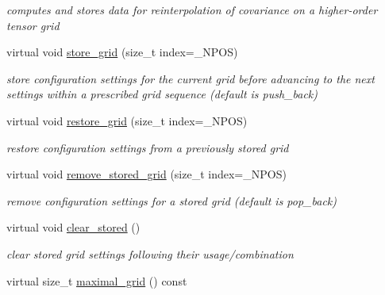 \begin{DoxyCompactItemize}
\begin{DoxyCompactList}\small\item\em computes and stores data for reinterpolation of covariance on a higher-\/order tensor grid \end{DoxyCompactList}\item 
virtual void \hyperlink{classPecos_1_1IntegrationDriver_aeae6e6d94a2e3e77d612eee151c77799}{store\+\_\+grid} (size\+\_\+t index=\+\_\+\+N\+P\+OS)\label{classPecos_1_1IntegrationDriver_aeae6e6d94a2e3e77d612eee151c77799}

\begin{DoxyCompactList}\small\item\em store configuration settings for the current grid before advancing to the next settings within a prescribed grid sequence (default is push\+\_\+back) \end{DoxyCompactList}\item 
virtual void \hyperlink{classPecos_1_1IntegrationDriver_a31ba839ff630bbc25292b448fff38a73}{restore\+\_\+grid} (size\+\_\+t index=\+\_\+\+N\+P\+OS)\label{classPecos_1_1IntegrationDriver_a31ba839ff630bbc25292b448fff38a73}

\begin{DoxyCompactList}\small\item\em restore configuration settings from a previously stored grid \end{DoxyCompactList}\item 
virtual void \hyperlink{classPecos_1_1IntegrationDriver_a93215ecdfbc51b7c45998fa4d65fc7fd}{remove\+\_\+stored\+\_\+grid} (size\+\_\+t index=\+\_\+\+N\+P\+OS)\label{classPecos_1_1IntegrationDriver_a93215ecdfbc51b7c45998fa4d65fc7fd}

\begin{DoxyCompactList}\small\item\em remove configuration settings for a stored grid (default is pop\+\_\+back) \end{DoxyCompactList}\item 
virtual void \hyperlink{classPecos_1_1IntegrationDriver_ae4337960917eda26a5672e5c6afbb62a}{clear\+\_\+stored} ()\label{classPecos_1_1IntegrationDriver_ae4337960917eda26a5672e5c6afbb62a}

\begin{DoxyCompactList}\small\item\em clear stored grid settings following their usage/combination \end{DoxyCompactList}\item 
virtual size\+\_\+t \hyperlink{classPecos_1_1IntegrationDriver_a6edda8aad31eb8a64e180e6a76a6e0e9}{maximal\+\_\+grid} () const \label{classPecos_1_1IntegrationDriver_a6edda8aad31eb8a64e180e6a76a6e0e9}


\end{DoxyCompactItemize}
